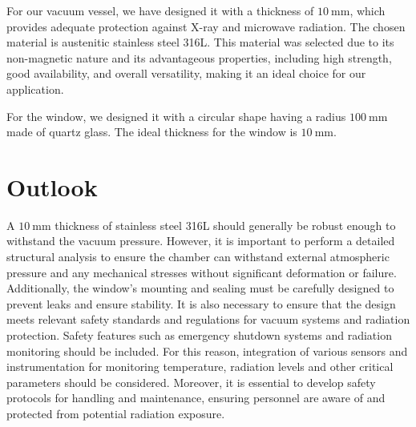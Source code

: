 For our vacuum vessel, we have designed it with a thickness of $\SI{10}{\milli\meter}$, which provides adequate protection against X-ray and microwave radiation.
The chosen material is austenitic stainless steel 316L.
This material was selected due to its non-magnetic nature and its advantageous properties, including high strength, good availability, and overall versatility, making it an ideal choice for our application.

For the window, we designed it with a circular shape having a radius $\SI{100}{\milli\meter}$ made of quartz glass.
The ideal thickness for the window is $\SI{10}{\milli\meter}$.

\section{Outlook}

A $\SI{10}{\milli\meter}$ thickness of stainless steel 316L should generally be robust enough to withstand the vacuum pressure.
However, it is important to perform a detailed structural analysis to ensure the chamber can withstand external atmospheric pressure and any mechanical stresses without significant deformation or failure.
Additionally, the window's mounting and sealing must be carefully designed to prevent leaks and ensure stability.
It is also necessary to ensure that the design meets relevant safety standards and regulations for vacuum systems and radiation protection.
Safety features such as emergency shutdown systems and radiation monitoring should be included.
For this reason, integration of various sensors and instrumentation for monitoring temperature, radiation levels and other critical parameters should be considered.
Moreover, it is essential to develop safety protocols for handling and maintenance, ensuring personnel are aware of and protected from potential radiation exposure.
